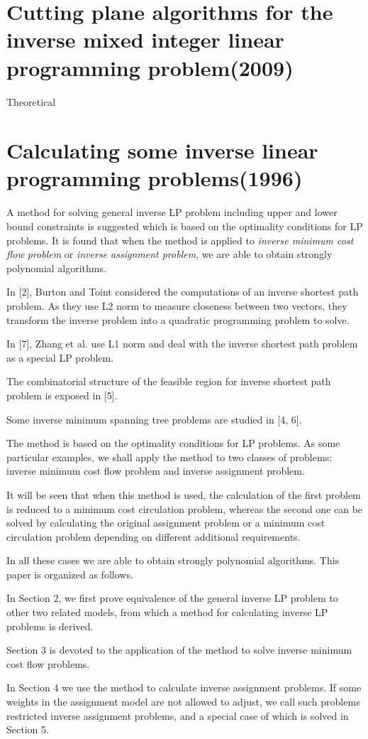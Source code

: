 \documentclass[UTF8]{article}
\begin{document}
\section{Cutting plane algorithms for the inverse mixed integer linear programming problem(2009)}

Theoretical


\section{Calculating some inverse linear programming problems(1996)}

A method for solving general inverse LP problem including upper and lower bound constraints is suggested which is based on the optimality conditions for LP problems. It is found that when the method is applied to \emph{inverse minimum cost flow problem} or \emph{inverse assignment problem}, we are able to obtain strongly polynomial algorithms.


In [2], Burton and Toint considered the computations of an inverse shortest path problem. As they use L2 norm to measure closeness between two vectors, they transform the inverse problem into a quadratic programming problem to solve.

In [7], Zhang et al. use L1 norm and deal with the inverse shortest path problem as a special LP problem.

The combinatorial structure of the feasible region for inverse shortest path problem is exposed in [5].

Some inverse minimum spanning tree problems are studied in [4, 6].

The method is based on the optimality conditions for LP problems. As some particular examples, we shall apply the method to two classes of problems: inverse minimum cost flow problem and inverse assignment problem.

It will be seen that when this method is used, the calculation of the first problem is reduced to a minimum cost circulation problem, whereas the second one can be solved by calculating the original assignment problem or a minimum cost circulation problem depending on different additional requirements.

In all these cases we are able to obtain strongly polynomial algorithms. This paper is organized as follows.

In Section 2, we first prove equivalence of the general inverse LP problem to other two related models, from which a method for calculating inverse LP problems is derived.

Section 3 is devoted to the application of the method to solve inverse minimum cost flow problems.

In Section 4 we use the method to calculate inverse assignment problems. If some weights in the assignment model are not allowed to adjust, we call such problems restricted inverse assignment problems, and a special case of which is solved in Section 5.
\end{document}
